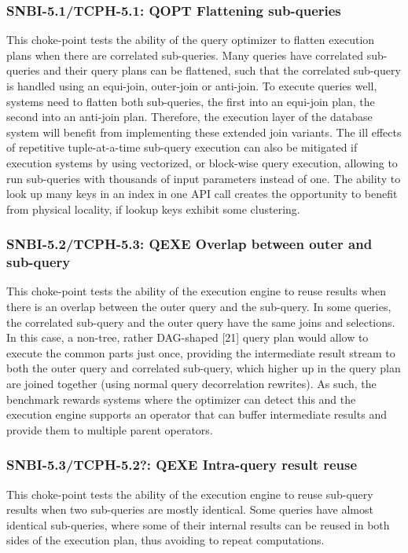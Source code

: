 \subsubsection{SNBI-5.1/TCPH-5.1: QOPT Flattening sub-queries}
\label{choke_point_5.1}
This choke-point tests the ability of the query optimizer to flatten execution plans when there are correlated sub-queries. Many queries have correlated sub-queries and their query plans can be flattened,
such that the correlated sub-query is handled using an equi-join, outer-join or anti-join. To execute queries well, systems need to flatten both sub-queries, the first into an equi-join plan, the second into an anti-join plan.
Therefore, the execution layer of the database system will benefit from implementing these extended join variants.
The ill effects of repetitive tuple-at-a-time sub-query execution can also be mitigated if execution systems by using vectorized, or block-wise query execution, allowing to run sub-queries with thousands of input parameters instead of one.
The ability to look up many keys in an index in one API call creates the opportunity to benefit from physical locality, if lookup keys exhibit some clustering.

\subsubsection{SNBI-5.2/TCPH-5.3: QEXE Overlap between outer and sub-query}
\label{choke_point_5.2}
This choke-point tests the ability of the execution engine to reuse results when there is an overlap between the outer query and the sub-query. In some queries, the correlated sub-query and the outer query have the same joins and selections.
In this case, a non-tree, rather DAG-shaped [21] query plan would allow to execute the common parts just once, providing the intermediate result stream to both the outer query and correlated sub-query,
which higher up in the query plan are joined together (using normal query decorrelation rewrites).
As such, the benchmark rewards systems where the optimizer can detect this and the execution engine supports an operator that can buffer intermediate results and provide them to multiple parent operators.

\subsubsection{SNBI-5.3/TCPH-5.2?: QEXE Intra-query result reuse}
\label{choke_point_5.3}
This choke-point tests the ability of the execution engine to reuse sub-query results when two sub-queries are mostly identical.
Some queries have almost identical sub-queries, where some of their internal results can be reused in both sides of the execution plan, thus avoiding to repeat computations.

